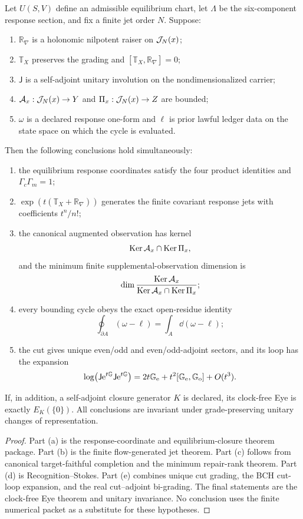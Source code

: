 \begin{theorem}
Let $U(S,V)$ define an admissible equilibrium chart, let $\Lambda$ be the six-component response section, and fix a finite jet order $N$.  Suppose:
\begin{enumerate}[label=(\roman*)]
\item $\mathbb R_\nabla$ is a holonomic nilpotent raiser on $\mathcal J_N(x)$;
\item $\mathbb T_X$ preserves the grading and $[\mathbb T_X,\mathbb R_\nabla]=0$;
\item $\mathsf J$ is a self-adjoint unitary involution on the nondimensionalized carrier;
\item $\mathcal A_x:\mathcal J_N(x)\to Y$ and $\Pi_x:\mathcal J_N(x)\to Z$ are bounded;
\item $\omega$ is a declared response one-form and $\ell$ is prior lawful ledger data on the state space on which the cycle is evaluated.
\end{enumerate}
Then the following conclusions hold simultaneously:
\begin{enumerate}[label=(\alph*)]
\item the equilibrium response coordinates satisfy the four product identities and $\Gamma_c\Gamma_m=1$;
\item $\exp(t(\mathbb T_X+\mathbb R_\nabla))$ generates the finite covariant response jets with coefficients $t^n/n!$;
\item the canonical augmented observation has kernel
\[
\operatorname{Ker}\mathcal A_x\cap\operatorname{Ker}\Pi_x,
\]
and the minimum finite supplemental-observation dimension is
\[
\dim\frac{\operatorname{Ker}\mathcal A_x}{\operatorname{Ker}\mathcal A_x\cap\operatorname{Ker}\Pi_x};
\]
\item every bounding cycle obeys the exact open-residue identity
\[
\oint_{\partial A}(\omega-\ell)=\int_A\dd(\omega-\ell);
\]
\item the cut gives unique even/odd and even/odd-adjoint sectors, and its loop has the expansion
\[
\log\!\left(\mathsf J\mathrm e^{t\mathbb G}\mathsf J\mathrm e^{t\mathbb G}\right)
=2t\mathbb G_{\mathrm e}
+t^2[\mathbb G_{\mathrm e},\mathbb G_{\mathrm o}]+O(t^3).
\]
\end{enumerate}
If, in addition, a self-adjoint closure generator $K$ is declared, its clock-free Eye is exactly $E_K(\{0\})$.  All conclusions are invariant under grade-preserving unitary changes of representation.
\end{theorem}

\begin{proof}
Part (a) is the response-coordinate and equilibrium-closure theorem package.  Part (b) is the finite flow-generated jet theorem.  Part (c) follows from canonical target-faithful completion and the minimum repair-rank theorem.  Part (d) is Recognition--Stokes.  Part (e) combines unique cut grading, the BCH cut-loop expansion, and the real cut--adjoint bi-grading.  The final statements are the clock-free Eye theorem and unitary invariance.  No conclusion uses the finite numerical packet as a substitute for these hypotheses.
\end{proof}

